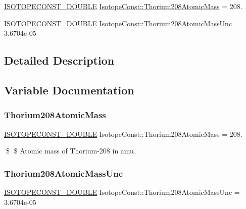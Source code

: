 \begin{DoxyCompactItemize}
\item 
\mbox{\hyperlink{group___isotope_const-_macros_ga8f45a7272ce02c0b4c65c44636ed719a}{I\+S\+O\+T\+O\+P\+E\+C\+O\+N\+S\+T\+\_\+\+D\+O\+U\+B\+LE}} \mbox{\hyperlink{group___isotope_const-_thorium-_th208_ga71d09097bfa6e816575883f25103cbcc}{Isotope\+Const\+::\+Thorium208\+Atomic\+Mass}} = 208.
\item 
\mbox{\hyperlink{group___isotope_const-_macros_ga8f45a7272ce02c0b4c65c44636ed719a}{I\+S\+O\+T\+O\+P\+E\+C\+O\+N\+S\+T\+\_\+\+D\+O\+U\+B\+LE}} \mbox{\hyperlink{group___isotope_const-_thorium-_th208_ga7c7866d59f22296a4ed4be82e0bedf79}{Isotope\+Const\+::\+Thorium208\+Atomic\+Mass\+Unc}} = 3.\+6704e-\/05
\end{DoxyCompactItemize}


\subsection{Detailed Description}


\subsection{Variable Documentation}
\mbox{\label{group___isotope_const-_thorium-_th208_ga71d09097bfa6e816575883f25103cbcc}} 
\subsubsection{\texorpdfstring{Thorium208\+Atomic\+Mass}{Thorium208AtomicMass}}
{\footnotesize\ttfamily \mbox{\hyperlink{group___isotope_const-_macros_ga8f45a7272ce02c0b4c65c44636ed719a}{I\+S\+O\+T\+O\+P\+E\+C\+O\+N\+S\+T\+\_\+\+D\+O\+U\+B\+LE}} Isotope\+Const\+::\+Thorium208\+Atomic\+Mass = 208.}

\$ \$ Atomic mass of Thorium-\/208 in amu. \mbox{\label{group___isotope_const-_thorium-_th208_ga7c7866d59f22296a4ed4be82e0bedf79}} 
\subsubsection{\texorpdfstring{Thorium208\+Atomic\+Mass\+Unc}{Thorium208AtomicMassUnc}}
{\footnotesize\ttfamily \mbox{\hyperlink{group___isotope_const-_macros_ga8f45a7272ce02c0b4c65c44636ed719a}{I\+S\+O\+T\+O\+P\+E\+C\+O\+N\+S\+T\+\_\+\+D\+O\+U\+B\+LE}} Isotope\+Const\+::\+Thorium208\+Atomic\+Mass\+Unc = 3.\+6704e-\/05}

